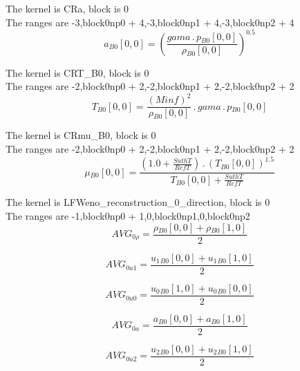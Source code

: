 \documentclass{article}
\begin{document}
\noindent The kernel is CRa, block is 0\\\noindent The ranges are -3,block0np0 + 4,-3,block0np1 + 4,-3,block0np2 + 4\\\begin{dmath}{a{_{B0}}}[{0,0}] = \left(\frac{gama \,.\, {p{_{B0}}}[{0,0}]}{{\rho{_{B0}}}[{0,0}]} \right)^{0.5}\end{dmath}

\noindent The kernel is CRT_B0, block is 0\\\noindent The ranges are -2,block0np0 + 2,-2,block0np1 + 2,-2,block0np2 + 2\\\begin{dmath}{T{_{B0}}}[{0,0}] = \frac{\left(Minf \right)^{2}}{{\rho{_{B0}}}[{0,0}]} \,.\, gama \,.\, {p{_{B0}}}[{0,0}]\end{dmath}

\noindent The kernel is CRmu_B0, block is 0\\\noindent The ranges are -2,block0np0 + 2,-2,block0np1 + 2,-2,block0np2 + 2\\\begin{dmath}{\mu{_{B0}}}[{0,0}] = \frac{\left(1.0 + \frac{SuthT}{RefT}\right) \,.\, \left({T{_{B0}}}[{0,0}] \right)^{1.5}}{{T{_{B0}}}[{0,0}] + \frac{SuthT}{RefT}}\end{dmath}

\noindent The kernel is LFWeno_reconstruction_0_direction, block is 0\\\noindent The ranges are -1,block0np0 + 1,0,block0np1,0,block0np2\\\begin{dmath}AVG_{0 \rho} = \frac{{\rho{_{B0}}}[{0,0}] + {\rho{_{B0}}}[{1,0}]}{2}\end{dmath}

\begin{dmath}AVG_{0 u1} = \frac{{u_{1}{_{B0}}}[{0,0}] + {u_{1}{_{B0}}}[{1,0}]}{2}\end{dmath}

\begin{dmath}AVG_{0 u0} = \frac{{u_{0}{_{B0}}}[{1,0}] + {u_{0}{_{B0}}}[{0,0}]}{2}\end{dmath}

\begin{dmath}AVG_{0 a} = \frac{{a{_{B0}}}[{0,0}] + {a{_{B0}}}[{1,0}]}{2}\end{dmath}

\begin{dmath}AVG_{0 u2} = \frac{{u_{2}{_{B0}}}[{0,0}] + {u_{2}{_{B0}}}[{1,0}]}{2}\end{dmath}
\end{document}
